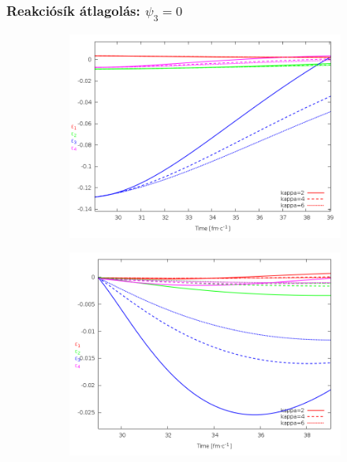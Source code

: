 \documentclass{beamer}
\begin{document}
\begin{frame}
\frametitle{Reakciósík átlagolás: $\psi_3=0$}
\begin{center}
\begin{itemize}
\setlength{\itemsep}{12pt}

\end{itemize}
\begin{figure}[H]
	\centering
    \begin{subfigure}[b]{0.49\textwidth}
    		\includegraphics[width=\textwidth]{pic/summer/avg_Psi3_p}
	\end{subfigure}
	\begin{subfigure}[b]{0.49\textwidth}
        	\includegraphics[width=\textwidth]{pic/summer/avg_Psi3_v}
	\end{subfigure}
\end{figure}
\end{center}
\end{frame}
\end{document}
